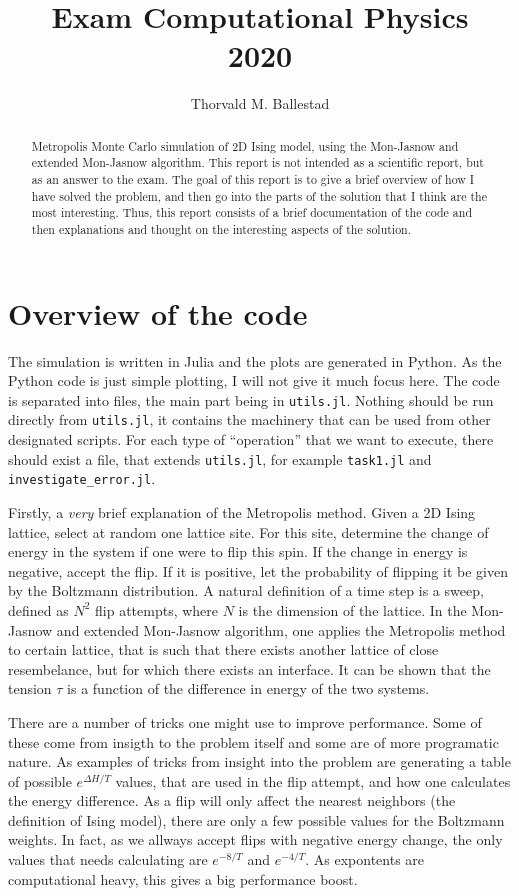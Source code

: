 \documentclass{article}
\title{Exam Computational Physics\\
  2020}
\author{Thorvald M. Ballestad}
\begin{document}
\maketitle
\begin{abstract}
  Metropolis Monte Carlo simulation of 2D Ising model, using the Mon-Jasnow and extended Mon-Jasnow algorithm.
  This report is not intended as a scientific report, but as an answer to the exam.
  The goal of this report is to give a brief overview of how I have solved the problem, and then go into the parts of the solution that I think are the most interesting.
  Thus, this report consists of a brief documentation of the code and then explanations and thought on the interesting aspects of the solution.
\end{abstract}

\section{Overview of the code}
The simulation is written in Julia and the plots are generated in Python.
As the Python code is just simple plotting, I will not give it much focus here.
The code is separated into files, the main part being in \verb|utils.jl|.
Nothing should be run directly from \verb|utils.jl|, it contains the machinery that can be used from other designated scripts.
For each type of ``operation'' that we want to execute, there should exist a file, that extends \verb|utils.jl|, for example \verb|task1.jl| and \verb|investigate_error.jl|.

Firstly, a \emph{very} brief explanation of the Metropolis method.
Given a 2D Ising lattice, select at random one lattice site.
For this site, determine the change of energy in the system if one were to flip this spin.
If the change in energy is negative, accept the flip.
If it is positive, let the probability of flipping it be given by the Boltzmann distribution.
A natural definition of a time step is a sweep, defined as $N^2$ flip attempts, where $N$ is the dimension of the lattice.
In the Mon-Jasnow and extended Mon-Jasnow algorithm, one applies the Metropolis method to certain lattice, that is such that there exists another lattice of close resembelance, but for which there exists an interface.
It can be shown that the tension $\tau$ is a function of the difference in energy of the two systems.

There are a number of tricks one might use to improve performance.
Some of these come from insigth to the problem itself and some are of more programatic nature.
As examples of tricks from insight into the problem are generating a table of possible $e^{\Delta H/T}$ values, that are used in the flip attempt, and how one calculates the energy difference.
As a flip will only affect the nearest neighbors (the definition of Ising model), there are only a few possible values for the Boltzmann weights.
In fact, as we allways accept flips with negative energy change, the only values that needs calculating are $e^{-8/T}$ and $e^{-4/T}$.
As expontents are computational heavy, this gives a big performance boost.
\end{document}
